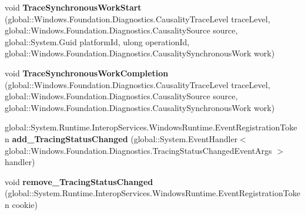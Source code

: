 \begin{DoxyCompactItemize}
\item 
\mbox{\label{interface_windows_1_1_foundation_1_1_diagnostics_1_1_i_async_causality_tracer_statics_a749785813f9caf99b9ac0f4fd89700a2}} 
void {\bfseries Trace\+Synchronous\+Work\+Start} (global\+::\+Windows.\+Foundation.\+Diagnostics.\+Causality\+Trace\+Level trace\+Level, global\+::\+Windows.\+Foundation.\+Diagnostics.\+Causality\+Source source, global\+::\+System.\+Guid platform\+Id, ulong operation\+Id, global\+::\+Windows.\+Foundation.\+Diagnostics.\+Causality\+Synchronous\+Work work)
\item 
\mbox{\label{interface_windows_1_1_foundation_1_1_diagnostics_1_1_i_async_causality_tracer_statics_a1543ef1de5733e88b1cf2a3424c199f5}} 
void {\bfseries Trace\+Synchronous\+Work\+Completion} (global\+::\+Windows.\+Foundation.\+Diagnostics.\+Causality\+Trace\+Level trace\+Level, global\+::\+Windows.\+Foundation.\+Diagnostics.\+Causality\+Source source, global\+::\+Windows.\+Foundation.\+Diagnostics.\+Causality\+Synchronous\+Work work)
\item 
\mbox{\label{interface_windows_1_1_foundation_1_1_diagnostics_1_1_i_async_causality_tracer_statics_adecd1f58d29fb341c2489d08610ac331}} 
global\+::\+System.\+Runtime.\+Interop\+Services.\+Windows\+Runtime.\+Event\+Registration\+Token {\bfseries add\+\_\+\+Tracing\+Status\+Changed} (global\+::\+System.\+Event\+Handler$<$ global\+::\+Windows.\+Foundation.\+Diagnostics.\+Tracing\+Status\+Changed\+Event\+Args $>$ handler)
\item 
\mbox{\label{interface_windows_1_1_foundation_1_1_diagnostics_1_1_i_async_causality_tracer_statics_a0b28a0699db651012d252a2063f84c0a}} 
void {\bfseries remove\+\_\+\+Tracing\+Status\+Changed} (global\+::\+System.\+Runtime.\+Interop\+Services.\+Windows\+Runtime.\+Event\+Registration\+Token cookie)
\item 
\mbox{\label{interface_windows_1_1_foundation_1_1_diagnostics_1_1_i_async_causality_tracer_statics_a38bdec695d719f8d62636334dcfb8dc5}} 

\end{DoxyCompactItemize}
